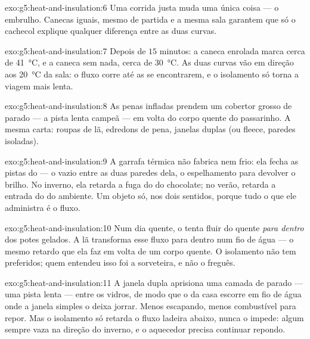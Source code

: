 \begin{solution}{exo:g5:heat-and-insulation:6}
Uma corrida justa muda uma única coisa --- o embrulho. Canecas
iguais, mesmo  de partida e a mesma sala garantem que só o
cachecol explique qualquer diferença entre as duas curvas.
\end{solution}

\begin{solution}{exo:g5:heat-and-insulation:7}
Depois de $15$ minutos: a caneca enrolada marca cerca de
\qty{41}{\celsius}, e a caneca sem nada, cerca de \qty{30}{\celsius}.
As duas curvas vão em direção aos \qty{20}{\celsius} da sala: o fluxo
corre até as  se encontrarem, e o isolamento só torna a
viagem mais lenta.
\end{solution}

\begin{solution}{exo:g5:heat-and-insulation:8}
As penas infladas prendem um cobertor grosso de  parado --- a pista
lenta campeã --- em volta do corpo quente do passarinho. A mesma
carta: roupas de lã, edredons de pena, janelas duplas (ou fleece,
paredes isoladas).
\end{solution}

\begin{solution}{exo:g5:heat-and-insulation:9}
A garrafa térmica não fabrica  nem frio: ela fecha as pistas do
 --- o vazio entre as duas paredes dela, o espelhamento para
devolver o brilho. No inverno, ela retarda a fuga do  do
chocolate; no verão, retarda a entrada do  do ambiente. Um
objeto só, nos dois sentidos, porque tudo o que ele administra é o
fluxo.
\end{solution}

\begin{solution}{exo:g5:heat-and-insulation:10}
Num dia quente, o  tenta fluir do  quente \emph{para dentro}
dos potes gelados. A lã transforma esse fluxo para dentro num fio de
água --- o mesmo retardo que ela faz em volta de um corpo quente. O
isolamento não tem preferidos; quem entendeu isso foi a sorveteira, e
não o freguês.
\end{solution}

\begin{solution}{exo:g5:heat-and-insulation:11}
A janela dupla aprisiona uma camada de  parado --- uma pista lenta
--- entre os vidros, de modo que o  da casa escorre em fio de
água onde a janela simples o deixa jorrar. Menos  escapando,
menos combustível para repor. Mas o isolamento só retarda o fluxo
ladeira abaixo, nunca o impede: algum  sempre vaza na direção do
inverno, e o aquecedor precisa continuar repondo.
\end{solution}
